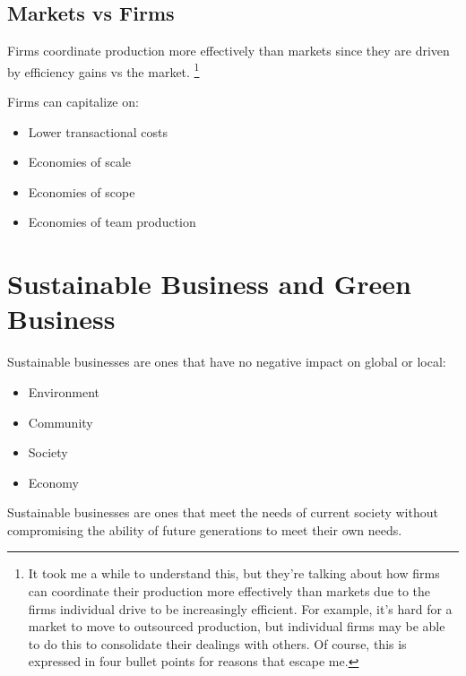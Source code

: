                     \subsection{Markets vs Firms} %
                    \label{sub:markets_vs_firms}
                        Firms coordinate production more effectively than markets since they are driven by efficiency gains vs the market.
                        \footnote{It took me a while to understand this, but they're talking about how firms can coordinate their production more effectively than markets due to the firms individual drive to be increasingly efficient.
                        For example, it's hard for a market to move to outsourced production, but individual firms may be able to do this to consolidate their dealings with others.
                        Of course, this is expressed in four bullet points for reasons that escape me.}

                        Firms can capitalize on:
                        \begin{itemize}
                            \item Lower transactional costs
                            \item Economies of scale
                            \item Economies of scope
                            \item Economies of team production
                        \end{itemize}
            \section{Sustainable Business and Green Business} %
            \label{sec:sustainable_business_and_green_business}
                Sustainable businesses are ones that have no negative impact on global or local:
                \begin{itemize}
                    \item Environment
                    \item Community
                    \item Society
                    \item Economy
                \end{itemize}
                Sustainable businesses are ones that meet the needs of current society without compromising the ability of future generations to meet their own needs.
